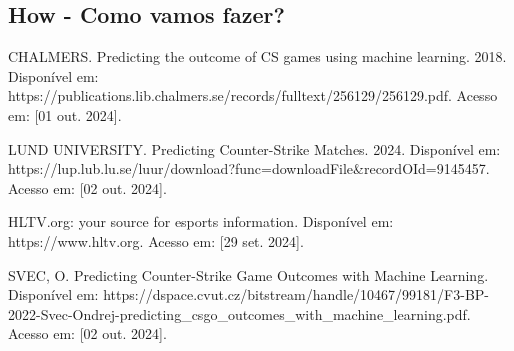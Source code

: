 \documentclass[a4paper,times,12pt]{article}
\begin{document}
\subsection{How - Como vamos fazer?}
\hspace{+15pt}



\newpage
\begin{thebibliography}{00}

 CHALMERS. Predicting the outcome of CS games using machine learning. 2018. Disponível em: https://publications.lib.chalmers.se/records/fulltext/256129/256129.pdf. Acesso em: [01 out. 2024].

 LUND UNIVERSITY. Predicting Counter-Strike Matches. 2024. Disponível em: https://lup.lub.lu.se/luur/download?func=downloadFile\&recordOId=9145457. Acesso em: [02 out. 2024].

 HLTV.org: your source for esports information. Disponível em: https://www.hltv.org. Acesso em: [29 set. 2024].

 SVEC, O. Predicting Counter-Strike Game Outcomes with Machine Learning. Disponível em: https://dspace.cvut.cz/bitstream/handle/10467/99181/F3-BP-2022-Svec-Ondrej-predicting\_csgo\_outcomes\_with\_machine\_learning.pdf. Acesso em: [02 out. 2024].

\end{thebibliography}
\end{document}
